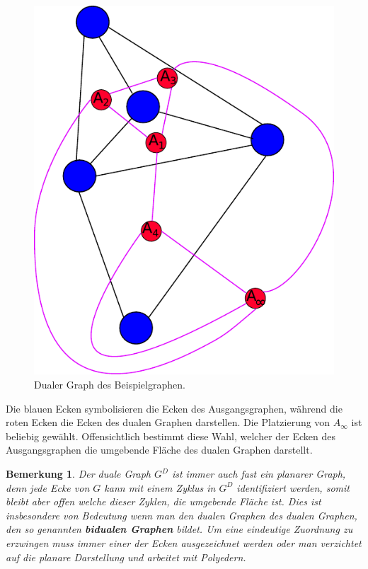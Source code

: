 \documentclass[11pt,a4paper,leqno]{report}
\newtheorem{remark}[theorem]{Bemerkung}
\numberwithin{equation}{chapter}
\begin{document}
\begin{figure}[H]
	\begin{center}
		\includegraphics[scale=0.4]{Abbildungen/graph_1_dual.pdf}
		\caption{Dualer Graph des Beispielgraphen.}
	\end{center}
\end{figure}
\noindent
Die blauen Ecken symbolisieren die Ecken des Ausgangsgraphen, während die roten Ecken die Ecken des dualen Graphen darstellen. Die Platzierung von $A_\infty$ ist beliebig gew\"ahlt. Offensichtlich bestimmt diese Wahl, welcher der Ecken des Ausgangsgraphen die umgebende Fl\"ache des dualen Graphen darstellt.
\begin{remark}
	Der duale Graph $G^D$ ist immer auch fast ein planarer Graph, denn jede Ecke von $G$ kann mit einem Zyklus in $G^D$ identifiziert werden, somit bleibt aber offen welche dieser Zyklen, die umgebende Fl\"ache ist. Dies ist insbesondere von Bedeutung wenn man den dualen Graphen des dualen Graphen, den so genannten \textbf{bidualen Graphen} bildet. Um eine eindeutige Zuordnung zu erzwingen muss immer einer der Ecken ausgezeichnet werden oder man verzichtet auf die planare Darstellung und arbeitet mit Polyedern. 
\end{remark}
\end{document}
